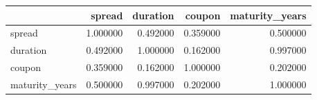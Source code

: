 \begin{tabular}{lrrrr}
\toprule
 & spread & duration & coupon & maturity_years \\
\midrule
spread & 1.000000 & 0.492000 & 0.359000 & 0.500000 \\
duration & 0.492000 & 1.000000 & 0.162000 & 0.997000 \\
coupon & 0.359000 & 0.162000 & 1.000000 & 0.202000 \\
maturity_years & 0.500000 & 0.997000 & 0.202000 & 1.000000 \\
\bottomrule
\end{tabular}
